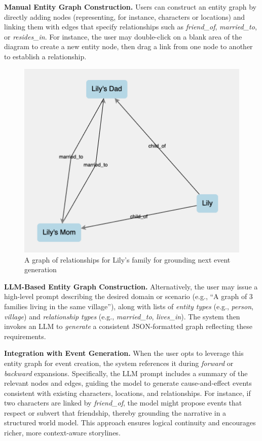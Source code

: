 \documentclass[11pt]{article}
\begin{document}
\textbf{Manual Entity Graph Construction.}
Users can construct an entity graph by directly adding nodes (representing, for instance, characters or locations) and linking them with edges that specify relationships such as \emph{friend\_of}, \emph{married\_to}, or \emph{resides\_in}. For instance, the user may double-click on a blank area of the diagram to create a new entity node, then drag a link from one node to another to establish a relationship.

\begin{figure}
    \centering
    \includegraphics[width=1\linewidth]{figures/entities.png}
    \caption{A graph of relationships for Lily's family for grounding next event generation}
    \label{fig:3}
\end{figure}

\textbf{LLM-Based Entity Graph Construction.}
Alternatively, the user may issue a high-level prompt describing the desired domain or scenario (e.g., ``A graph of 3 families living in the same village''), along with lists of \emph{entity types} (e.g., \textit{person}, \textit{village}) and \emph{relationship types} (e.g., \textit{married\_to}, \textit{lives\_in}). The system then invokes an LLM to \emph{generate} a consistent JSON-formatted graph reflecting these requirements.

\textbf{Integration with Event Generation.}
When the user opts to leverage this entity graph for event creation, the system references it during \emph{forward} or \emph{backward} expansions. Specifically, the LLM prompt includes a summary of the relevant nodes and edges, guiding the model to generate cause-and-effect events consistent with existing characters, locations, and relationships. For instance, if two characters are linked by \textit{friend\_of}, the model might propose events that respect or subvert that friendship, thereby grounding the narrative in a structured world model. This approach ensures logical continuity and encourages richer, more context-aware storylines.
\end{document}
